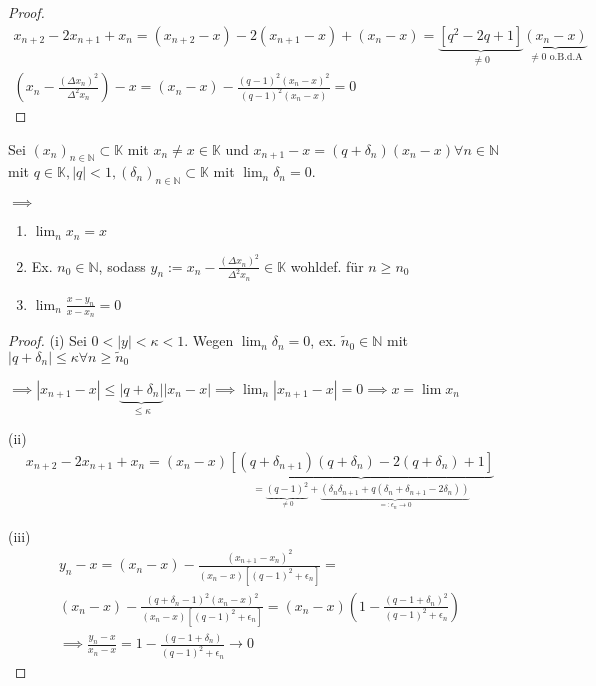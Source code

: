 \begin{proof}
	\begin{align*}
		x_{n+2} - 2x_{n+1} + x_n = (x_{n+2} - x) - 2(x_{n+1} - x) + (x_n - x) = \underbrace{[q^2 - 2q + 1]}_{\neq 0} \underbrace{(x_n - x)}_{\neq 0 \text{ o.B.d.A}}\\
		\left(x_n - \frac{(\Delta x_n)^2}{\Delta^2 x_n}\right)- x = (x_n - x) - \frac{(q-1)^2(x_n - x)^2}{(q-1)^2 (x_n - x)} = 0
	\end{align*}
\end{proof}

\begin{theorem}
	Sei $(x_n)_{n\in \mathbb{N}} \subset \mathbb{K}$ mit $x_n \neq x \in \mathbb{K}$ und $x_{n+1} - x = (q + \delta_n)(x_n - x) \forall n \in \mathbb{N}$ mit $q \in \mathbb{K}, |q| < 1, (\delta_n)_{n\in \mathbb{N}} \subset \mathbb{K}$ mit $\lim_n \delta_n = 0$.
	
	$\implies$ \begin{enumerate}
		\item $\lim_n x_n = x$
		\item Ex. $n_0 \in \mathbb{N}$, sodass $y_n := x_n - \frac{(\Delta x_n)^2}{\Delta^2 x_n} \in \mathbb{K}$ wohldef. für $n \geq n_0$
		\item $\lim_n \frac{x-y_n}{x-x_n} = 0$
	\end{enumerate}
\end{theorem}

\begin{proof}
	(i) Sei $0 < |y| < \kappa < 1$. Wegen $\lim_n \delta_n = 0$, ex. $\tilde{n}_0 \in \mathbb{N}$ mit $|q + \delta_n| \leq \kappa \forall n \geq \tilde{n}_0$
	
	$\implies |x_{n+1} - x| \leq \underbrace{|q + \delta_n|}_{\leq \kappa} |x_n - x| \implies \lim_n |x_{n+1}-x| = 0 \implies x = \lim x_n$
	
	(ii)
	\begin{align*}
		x_{n+2} - 2 x_{n+1} + x_n = (x_n - x) \underbrace{[(q+\delta_{n+1}) (q+\delta_n) - 2(q+\delta_n) + 1]}_{=\underbrace{(q-1)^2}_{\neq 0} + \underbrace{(\delta_n \delta_{n+1} + q(\delta_n + \delta_{n+1} - 2 \delta_n))}_{=: \epsilon_n \rightarrow 0}}
	\end{align*}
	
	(iii)
	\begin{align*}
		y_n - x = (x_n - x) - \frac{(x_{n+1} - x_n)^2}{(x_n - x)[(q-1)^2 + \epsilon_n]} =\\
		(x_n - x) - \frac{(q+\delta_n - 1)^2 (x_n -x)^2}{(x_n - x)[(q-1)^2 + \epsilon_n]} =
		(x_n - x)\left(1 - \frac{(q-1+\delta_n)^2}{(q-1)^2 + \epsilon_n}\right)\\
		\implies \frac{y_n - x}{x_n - x} = 1 - \frac{(q - 1 + \delta_n)}{(q-1)^2 + \epsilon_n} \rightarrow 0
	\end{align*}
\end{proof}

